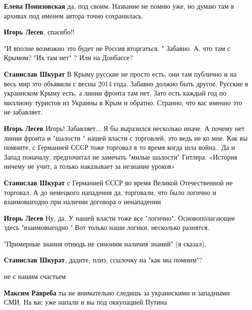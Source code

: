 \begin{itemize}
\begin{itemize} %
\textbf{Елена Понизовская} да, под своим. Название не помню уже, но думаю там в архивах под именем автора точно сохранилась.

\textbf{Игорь Лесев}, спасибо!!
\end{itemize} %


"И вполне возможно это будет не Россия вторгаться. " Забавно. А, что там с
Крымом? "Их там нет" ? Или на Донбассе?

\begin{itemize} %
\textbf{Станислав Шкурат} В Крыму русские не просто есть, они там публично и на весь мир это объявили с весны 2014 года. Забавно должно быть другое. Русские в украинском Крыму есть, а линии фронта там нет. Зато есть каждый год по миллиону туристов из Украины в Крым и обратно. Странно, что вас именно это не забавляет.

\textbf{Игорь Лесев} Игорь! Забавляет... Я бы выразился несколько иначе. А почему нет линии фронта и "шалости " нашей власти с торговлей, это ведь не ко мне. Как вы помните, с Германией СССР тоже торговал в то время когда шла война.. Да и Запад поначалу, предпочитал не замечать "милые шалости" Гитлера. «История ничему не учит, а только наказывает за незнание уроков»

\textbf{Станислав Шкурат} с Германией СССР во время Великой Отечественной не торговал. А до немецкого нападения да, торговали, что было логично и взаимовыгодно при наличии договора о ненападении

\textbf{Игорь Лесев} Ну, да. У нашей власти тоже все "логично". Основополагающее здесь "взаимовыгодно ".Вот только наши логики, несколько разнятся.

"Примерные знания отнюдь не синоним наличия знаний" (я сказал).

\textbf{Станислав Шкурат}, дадите, плиз, ссылочку на "как мы помним"?
\end{itemize} %

не с нашим счастьем

\begin{itemize} %
\textbf{Максим Равреба} ты не внимательно следишь за украинскими и западными СМИ. На вас уже напали и вы под оккупацией Путина


\end{itemize}
\end{itemize}

